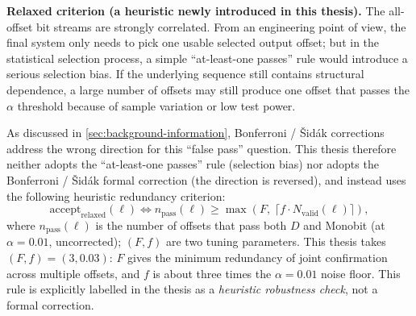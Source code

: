\documentclass[11pt,titlepage,openany,oneside]{book}  %
\begin{document}
\textbf{Relaxed criterion (a heuristic newly introduced in this thesis).} The all-offset bit streams are strongly correlated. From an engineering point of view, the final system only needs to pick one usable selected output offset; but in the statistical selection process, a simple ``at-least-one passes'' rule would introduce a serious selection bias. If the underlying sequence still contains structural dependence, a large number of offsets may still produce one offset that passes the $\alpha$ threshold because of sample variation or low test power.

As discussed in \cref{sec:background-information}, Bonferroni / \v{S}id\'ak corrections address the wrong direction for this ``false pass'' question. This thesis therefore neither adopts the ``at-least-one passes'' rule (selection bias) nor adopts the Bonferroni / \v{S}id\'ak formal correction (the direction is reversed), and instead uses the following heuristic redundancy criterion:
\begin{equation}
\text{accept}_{\text{relaxed}}(\ell) \iff n_{\text{pass}}(\ell) \ge \max\!\left(F,\; \lceil f \cdot N_{\text{valid}}(\ell) \rceil\right),
\end{equation}
where $n_{\text{pass}}(\ell)$ is the number of offsets that pass both $D$ and Monobit (at $\alpha = 0.01$, uncorrected); $(F, f)$ are two tuning parameters. This thesis takes $(F, f) = (3, 0.03)$: $F$ gives the minimum redundancy of joint confirmation across multiple offsets, and $f$ is about three times the $\alpha = 0.01$ noise floor. This rule is explicitly labelled in the thesis as a \emph{heuristic robustness check}, not a formal correction.
\end{document}
